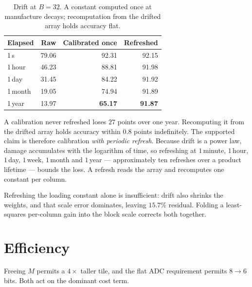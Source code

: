 \documentclass[conference,10pt]{IEEEtran}
\begin{document}
\begin{table}[t]
\centering
\caption{Drift at $B{=}32$. A constant computed once at manufacture decays;
recomputation from the drifted array holds accuracy flat.}
\label{tab:drift}
\begin{tabular}{lrrr}
\toprule
Elapsed & Raw & Calibrated once & Refreshed \\
\midrule
1\,s     & 79.06 & 92.31 & 92.15 \\
1\,hour  & 46.23 & 88.81 & 91.98 \\
1\,day   & 31.45 & 84.22 & 91.92 \\
1\,month & 19.05 & 74.94 & 91.89 \\
1\,year  & 13.97 & \textbf{65.17} & \textbf{91.87} \\
\bottomrule
\end{tabular}
\end{table}

A calibration never refreshed loses $27$ points over one year. Recomputing it
from the drifted array holds accuracy within $0.8$ points indefinitely. The
supported claim is therefore calibration \emph{with periodic refresh}. Because
drift is a power law, damage accumulates with the logarithm of time, so
refreshing at $1$\,minute, $1$\,hour, $1$\,day, $1$\,week, $1$\,month and
$1$\,year --- approximately ten refreshes over a product lifetime --- bounds the
loss. A refresh reads the array and recomputes one constant per column.

Refreshing the loading constant alone is insufficient: drift also shrinks the
weights, and that scale error dominates, leaving $15.7\%$ residual. Folding a
least-squares per-column gain into the block scale corrects both together.

\section{Efficiency}
\label{sec:eff}

Freeing $M$ permits a $4\times$ taller tile, and the flat ADC requirement
permits $8\to6$ bits. Both act on the dominant cost term.
\end{document}
